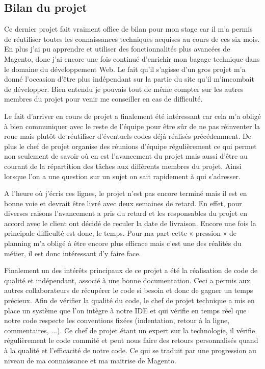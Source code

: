\documentclass[a4paper,11pt,twoside]{report}
\begin{document}
    \subsection*{Bilan du projet}
    Ce dernier projet fait vraiment office de bilan pour mon stage car il m'a permis de réutiliser toutes les connaissances techniques acquises au cours de ces six mois. En plus j'ai pu apprendre et utiliser des fonctionnalités plus avancées de Magento, donc j'ai encore une fois continué d'enrichir mon bagage technique dans le domaine du développement Web. Le fait qu'il s'agisse d'un gros projet m'a donné l'occasion d'être plus indépendant sur la partie du site qu'il m'imcombait de développer. Bien entendu je pouvais tout de même compter sur les autres membres du projet pour venir me conseiller en cas de difficulté.
    
    Le fait d'arriver en cours de projet a finalement été intéressant car cela m'a obligé à bien communiquer avec le reste de l'équipe pour être sûr de ne pas réinventer la roue mais plutôt de réutiliser d'éventuels codes déjà réalisés précédemment. De plus le chef de projet organise des réunions d'équipe régulièrement ce qui permet non seulement de savoir où en est l'avancement du projet mais aussi d'être au courant de la répartition des tâches aux différents membres du projet. Ainsi lorsque l'on a une question sur un sujet on sait rapidement à qui s'adresser. 
    
    A l'heure où j'écris ces lignes, le projet n'est pas encore terminé mais il est en bonne voie et devrait être livré avec deux semaines de retard. En effet, pour diverses raisons l'avancement a pris du retard et les responsables du projet en accord avec le client ont décidé de reculer la date de livraison. Encore une fois la principale difficulté est donc, le temps. Pour ma part cette « pression » de planning m'a obligé à être encore plus efficace mais c'est une des réalités du métier, il est donc intéressant d'y faire face. 
    
    Finalement un des intérêts principaux de ce projet a été la réalisation de code de qualité et indépendant, associé à une bonne documentation. Ceci a permis aux autres collaborateurs de récupérer le code si besoin et donc de gagner un temps précieux. Afin de vérifier la qualité du code, le chef de projet technique a mis en place un système que l'on intègre à notre IDE et qui vérifie en temps réel que notre code respecte les conventions fixées (indentation, retour à la ligne, commentaires, ...). Ce chef de projet étant un expert sur la technologie, il vérifie régulièrement le code commité et peut nous faire des retours personnalisés quand à la qualité et l'efficacité de notre code. Ce qui se traduit par une progression au niveau de ma connaissance et ma maitrise de Magento. 
    
\end{document}
